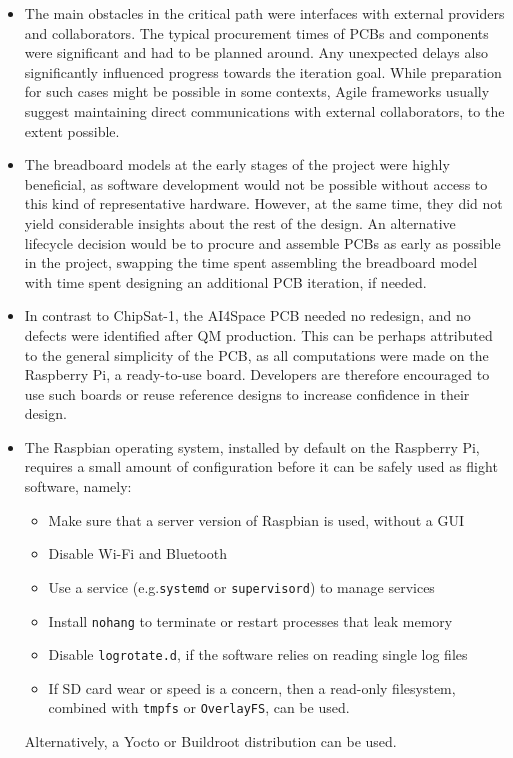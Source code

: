 \documentclass[a4paper,nobib,justified,final]{tufte-book}
\begin{document}
\begin{itemize}[itemsep=-1ex]
\item The main obstacles in the critical path were interfaces with external providers and collaborators. The typical procurement times of \acp{PCB} and components were significant and had to be planned around. Any unexpected delays also significantly influenced progress towards the iteration goal. While preparation for such cases might be possible in some contexts, Agile frameworks usually suggest maintaining direct communications with external collaborators, to the extent possible.

\item The breadboard models at the early stages of the project were highly beneficial, as software development would not be possible without access to this kind of representative hardware. However, at the same time, they did not yield considerable insights about the rest of the design. An alternative lifecycle decision would be to procure and assemble \acsp{PCB} as early as possible in the project, swapping the time spent assembling the breadboard model with time spent designing an additional \acs{PCB} iteration, if needed.

\item In contrast to ChipSat-1, the AI4Space \acs{PCB} needed no redesign, and no defects were identified after \ac{QM} production. This can be perhaps attributed to the general simplicity of the \acs{PCB}, as all computations were made on the Raspberry Pi, a ready-to-use board. Developers are therefore encouraged to use such boards or reuse reference designs to increase confidence in their design.

\item  The Raspbian operating system, installed by default on the Raspberry Pi, requires a small amount of configuration before it can be safely used as flight software, namely:
\begin{itemize}[itemsep=-2ex]
	\item Make sure that a server version of Raspbian is used, without a \acs{GUI}
	\item Disable Wi-Fi and Bluetooth
	\item Use a service (e.g.\@ \texttt{systemd} or \texttt{supervisord}) to manage services
	\item Install \texttt{nohang} to terminate or restart processes that leak memory
	\item Disable \texttt{logrotate.d}, if the software relies on reading single log files
	\item If \acs{SD} card wear or speed is a concern, then a read-only filesystem, combined with \texttt{tmpfs} or \texttt{OverlayFS}, can be used.
\end{itemize}
Alternatively, a Yocto or Buildroot distribution can be used.



\end{itemize}
\end{document}
